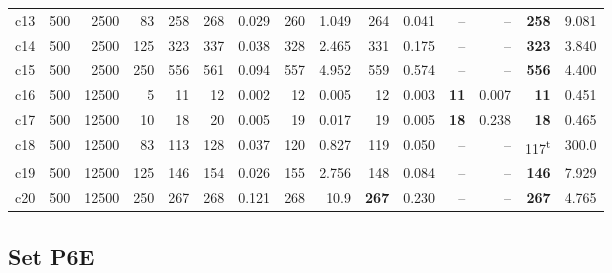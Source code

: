\begin{longtable}{@{}lrrrr@{\hspace{9pt}}rr@{\hspace{9pt}}rr@{\hspace{9pt}}rr@{\hspace{9pt}}rr@{\hspace{9pt}}rr@{}}
c13 & 500 & 2500 & 83 & 258 & 268 & 0.029 & 260 & 1.049 & 264 & 0.041 & -- & -- & \textbf{258} & 9.081\\
c14 & 500 & 2500 & 125 & 323 & 337 & 0.038 & 328 & 2.465 & 331 & 0.175 & -- & -- & \textbf{323} & 3.840\\
c15 & 500 & 2500 & 250 & 556 & 561 & 0.094 & 557 & 4.952 & 559 & 0.574 & -- & -- & \textbf{556} & 4.400\\
c16 & 500 & 12500 & 5 & 11 & 12 & 0.002 & 12 & 0.005 & 12 & 0.003 & \textbf{11} & 0.007 & \textbf{11} & 0.451\\
c17 & 500 & 12500 & 10 & 18 & 20 & 0.005 & 19 & 0.017 & 19 & 0.005 & \textbf{18} & 0.238 & \textbf{18} & 0.465\\
c18 & 500 & 12500 & 83 & 113 & 128 & 0.037 & 120 & 0.827 & 119 & 0.050 & -- & -- & 117\textsuperscript{t} & 300.0\\
c19 & 500 & 12500 & 125 & 146 & 154 & 0.026 & 155 & 2.756 & 148 & 0.084 & -- & -- & \textbf{146} & 7.929\\
c20 & 500 & 12500 & 250 & 267 & 268 & 0.121 & 268 & 10.9 & \textbf{267} & 0.230 & -- & -- & \textbf{267} & 4.765\\
\bottomrule\end{longtable}\endgroup
{}\subsection*{Set P6E}
\begingroup\footnotesize\setlength{\tabcolsep}{2.6pt}\setlength{\LTpre}{2pt}
